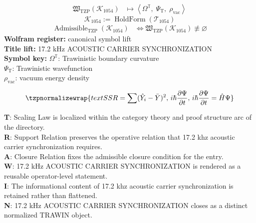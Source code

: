 \noindent
\begin{minipage}[t]{0.48\linewidth}
\begingroup
\small
\[
\begin{aligned}
\mathfrak{W}_{\mathrm{TZP}}\!\left(\mathcal{K}_{1054}\right)
&\longmapsto
\left\langle \Omega^{\mathbb{T}},\; \Psi_{\mathrm{T}},\; \rho_{\mathrm{vac}} \right\rangle
\end{aligned}
\]
\[
\mathcal{K}_{1054}
:=
\operatorname{HoldForm}\!\left(\mathcal{T}_{1054}\right)
\]
\[
\begin{aligned}
\operatorname{Admissible}_{\mathrm{TZP}}\!\left(\mathcal{K}_{1054}\right)
&\Longleftrightarrow
\mathfrak{W}_{\mathrm{TZP}}\!\left(\mathcal{K}_{1054}\right)\not\equiv\varnothing
\end{aligned}
\]
\textbf{Wolfram register:} canonical symbol lift\\
\textbf{Title lift:} 17.2 kHz ACOUSTIC CARRIER SYNCHRONIZATION\\
\textbf{Symbol key:} \(\Omega^{\mathbb{T}}\): Trawinistic boundary curvature\\ \(\Psi_{\mathrm{T}}\): Trawinistic wavefunction\\ \(\rho_{\mathrm{vac}}\): vacuum energy density
\par
\endgroup
\end{minipage}\hfill
\begin{minipage}[t]{0.48\linewidth}
\[
\tzpnormalizewrap{text{SSR} = \sum (\hat{Y}_i - \bar{Y})^2,\,i\hbar \frac{\partial \Psi}{\partial t},\,i\hbar \frac{\partial \Psi}{\partial t} = \hat{H} \Psi}
\]

\small
\textbf{T}: Scaling Law is localized within the category theory and proof structure arc of the directory.\\
\textbf{R}: Support Relation preserves the operative relation that 17.2 khz acoustic carrier synchronization requires.\\
\textbf{A}: Closure Relation fixes the admissible closure condition for the entry.\\
\textbf{W}: 17.2 kHz ACOUSTIC CARRIER SYNCHRONIZATION is rendered as a reusable operator-level statement.\\
\textbf{I}: The informational content of 17.2 khz acoustic carrier synchronization is retained rather than flattened.\\
\textbf{N}: 17.2 kHz ACOUSTIC CARRIER SYNCHRONIZATION closes as a distinct normalized TRAWIN object.
\normalsize
\end{minipage}

